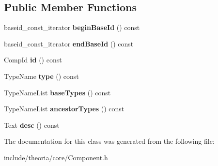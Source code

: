 \subsection*{Public Member Functions}
\begin{DoxyCompactItemize}
\item 
\hypertarget{classtheoria_1_1core_1_1ComponentData_a93362592e0c3f5e624e06cca44f3b451}{baseid\+\_\+const\+\_\+iterator {\bfseries begin\+Base\+Id} () const }\label{classtheoria_1_1core_1_1ComponentData_a93362592e0c3f5e624e06cca44f3b451}

\item 
\hypertarget{classtheoria_1_1core_1_1ComponentData_a177b871167661709317659aaa2229ee1}{baseid\+\_\+const\+\_\+iterator {\bfseries end\+Base\+Id} () const }\label{classtheoria_1_1core_1_1ComponentData_a177b871167661709317659aaa2229ee1}

\item 
\hypertarget{classtheoria_1_1core_1_1ComponentData_ae2b0bd7575fb44f9e75b70f07f71fb59}{Comp\+Id {\bfseries id} () const }\label{classtheoria_1_1core_1_1ComponentData_ae2b0bd7575fb44f9e75b70f07f71fb59}

\item 
\hypertarget{classtheoria_1_1core_1_1ComponentData_a577f3f27a672f1b9e9bfb32a4798a44b}{Type\+Name {\bfseries type} () const }\label{classtheoria_1_1core_1_1ComponentData_a577f3f27a672f1b9e9bfb32a4798a44b}

\item 
\hypertarget{classtheoria_1_1core_1_1ComponentData_affc0a5651ebe40065a90cc509ebbfd26}{Type\+Name\+List {\bfseries base\+Types} () const }\label{classtheoria_1_1core_1_1ComponentData_affc0a5651ebe40065a90cc509ebbfd26}

\item 
\hypertarget{classtheoria_1_1core_1_1ComponentData_ae91ba10ae25d424d95ea85920922918d}{Type\+Name\+List {\bfseries ancestor\+Types} () const }\label{classtheoria_1_1core_1_1ComponentData_ae91ba10ae25d424d95ea85920922918d}

\item 
\hypertarget{classtheoria_1_1core_1_1ComponentData_a274e11c7bcb69b90c4b1a8d6fe844a36}{Text {\bfseries desc} () const }\label{classtheoria_1_1core_1_1ComponentData_a274e11c7bcb69b90c4b1a8d6fe844a36}

\end{DoxyCompactItemize}


The documentation for this class was generated from the following file\+:\begin{DoxyCompactItemize}
\item 
include/theoria/core/Component.\+h\end{DoxyCompactItemize}
